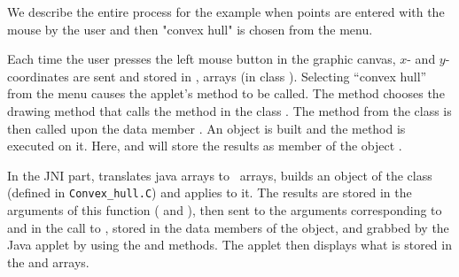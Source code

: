 We describe the entire process for the example when points are entered
with the mouse by the user and then "convex hull" is chosen from the
menu.

Each time the user presses the left mouse button in the graphic
canvas, $x$- and $y$-coordinates are sent and stored in ,  arrays 
(in class  ). Selecting ``convex hull'' from the menu causes
the applet's   method to be called.  The  method 
chooses the  drawing method that
calls the    method in the class  . 
The   method from the class    
is then called upon the  data member  . 
An   object is built and the method  
is executed on it. Here,  and  will store the 
results as member of the object .

In the JNI part,  translates java arrays
to \CC\ arrays, builds an object of the class  
(defined in \texttt{Convex\_hull.C}) and applies 
to it. The results are stored in the arguments of this function (
and ), then sent to the arguments corresponding to
 and  in the call to , 
stored in the data members of the  object, and grabbed 
by the Java applet by using the  and   methods. 
The applet then displays what is stored in the  and  arrays.

